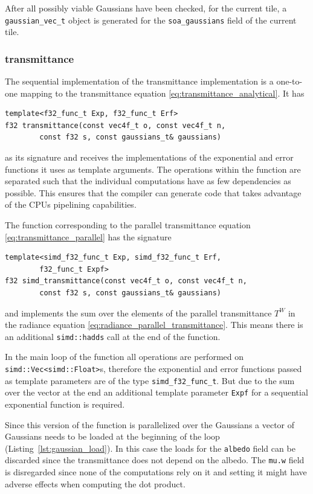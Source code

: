\documentclass[a4paper, 11pt]{memoir}
\begin{document}
    After all possibly viable Gaussians have been checked, for the current tile, a \texttt{gaussian_vec_t} object
    is generated for the \texttt{soa_gaussians} field of the current tile.

    \subsubsection{\gls{transmittance}}
    The sequential implementation of the \gls{transmittance} implementation is a one-to-one mapping to the
    \gls{transmittance} equation \eqref{eq:transmittance_analytical}. It has
    \begin{verbatim}
template<f32_func_t Exp, f32_func_t Erf>
f32 transmittance(const vec4f_t o, const vec4f_t n,
        const f32 s, const gaussians_t& gaussians)
    \end{verbatim}
    as its signature and receives the implementations of the exponential and error functions it uses as template
    arguments. The operations within the function are separated such that the individual computations have as few
    dependencies as possible. This ensures that the compiler can generate code that takes advantage of the CPUs
    \gls{pipelining} capabilities.
    
    The function corresponding to the parallel \gls{transmittance} equation \eqref{eq:transmittance_parallel} has the
    signature
    \begin{verbatim}
template<simd_f32_func_t Exp, simd_f32_func_t Erf,
        f32_func_t Expf>
f32 simd_transmittance(const vec4f_t o, const vec4f_t n,
        const f32 s, const gaussians_t& gaussians)
    \end{verbatim}
    and implements the sum over the elements of the parallel \gls{transmittance} $T^W$ in the \gls{radiance} equation
    \eqref{eq:radiance_parallel_transmittance}. This means there is an additional \texttt{simd::hadds} call
    at the end of the function.

    In the main loop of the function all operations are performed on \texttt{simd::Vec<simd::Float>}s, therefore
    the exponential and error functions passed as template parameters are of the type \texttt{simd_f32_func_t}.
    But due to the sum over the vector at the end an additional template parameter \texttt{Expf} for a
    sequential exponential function is required.

    Since this version of the function is parallelized over the Gaussians a vector of Gaussians needs to be loaded at the
    beginning of the loop (Listing~\ref{lst:gaussian_load}). In this case the loads for the \texttt{albedo}
    field can be discarded since the \gls{transmittance} does not depend on the \gls{albedo}. The \texttt{mu.w}
    field is disregarded since none of the computations rely on it and setting it might have adverse effects when
    computing the dot product.
\end{document}
